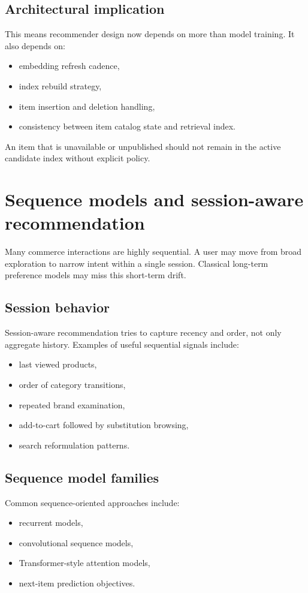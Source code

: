 \subsection{Architectural implication}
This means recommender design now depends on more than model training.
It also depends on:
\begin{itemize}
  \item embedding refresh cadence,
  \item index rebuild strategy,
  \item item insertion and deletion handling,
  \item consistency between item catalog state and retrieval index.
\end{itemize}

An item that is unavailable or unpublished should not remain in the active candidate index without explicit policy.

\section{Sequence models and session-aware recommendation}
Many commerce interactions are highly sequential.
A user may move from broad exploration to narrow intent within a single session.
Classical long-term preference models may miss this short-term drift.

\subsection{Session behavior}
Session-aware recommendation tries to capture recency and order, not only aggregate history.
Examples of useful sequential signals include:
\begin{itemize}
  \item last viewed products,
  \item order of category transitions,
  \item repeated brand examination,
  \item add-to-cart followed by substitution browsing,
  \item search reformulation patterns.
\end{itemize}

\subsection{Sequence model families}
Common sequence-oriented approaches include:
\begin{itemize}
  \item recurrent models,
  \item convolutional sequence models,
  \item Transformer-style attention models,
  \item next-item prediction objectives.
\end{itemize}

